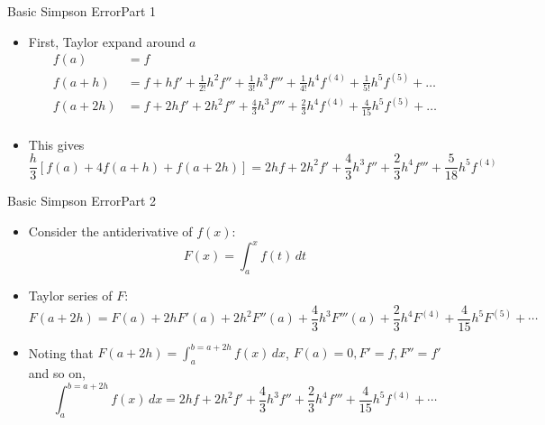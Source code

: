\documentclass[10pt]{beamer}
\begin{document}

\begin{frame}{Basic Simpson Error}{Part 1}
\begin{itemize}
    \item First, Taylor expand around $a$
        \begin{align*}
        f(a) & = f\\
        f(a+h) & = f + hf' + \frac{1}{2!}h^2 f'' + \frac{1}{3!}h^3 f''' + \frac{1}{4!}h^4 f^{(4)} + \frac{1}{5!}h^5 f^{(5)} + \dots\\
        f(a+2h) & = f + 2hf' + 2h^2 f'' + \frac{4}{3}h^3 f''' + \frac{2}{3}h^4 f^{(4)} + \frac{4}{15}h^5 f^{(5)} + \dots\\
        \end{align*}
    \item This gives
        \begin{equation*}
        \frac{h}{3}\left[f(a)+4f(a+h)+f(a+2h)\right] = 2hf +2h^2f' + \frac{4}{3}h^3f''+\frac{2}{3}h^4f'''+\frac{5}{18}h^5f^{(4)}
        \end{equation*}
\end{itemize}

\end{frame}
\begin{frame}{Basic Simpson Error}{Part 2}
\begin{itemize}
    \item Consider the antiderivative of $f(x)$:
        \[
        F(x) = \int_a^x f(t) \, dt
        \]
    \item Taylor series of $F$:
        \[
        F(a+2h) = F(a) + 2h F'(a) + 2h^2 F''(a) + \frac{4}{3}h^3F'''(a) + \frac{2}{3} h^4 F^{(4)} +\frac{4}{15}h^5 F^{(5)} + \cdots
        \]
    \item Noting that $F(a+2h) = \int_{a}^{b=a+2h}f(x)\,dx$, $F(a) = 0, F' = f, F'' = f'$ and so on,
        \begin{equation*}
        \int_{a}^{b=a+2h}f(x)\,dx = 2hf +2h^2f' + \frac{4}{3}h^3f''+\frac{2}{3}h^4f'''+\frac{4}{15}h^5f^{(4)} + \cdots
        \end{equation*}
\end{itemize}
\end{frame}
\end{document}
